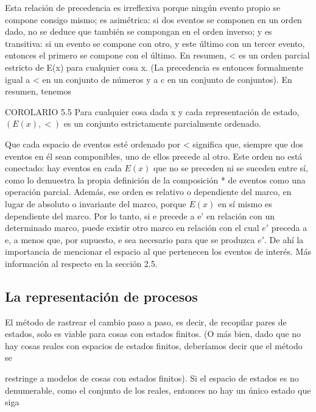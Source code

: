 
\begin{justifying}
    Esta relación de precedencia es irreflexiva porque ningún evento propio se compone consigo mismo; es asimétrica: si dos eventos se componen en un orden dado, no se deduce que también se compongan en el orden inverso; y es transitiva: si un evento se compone con otro, y este último con un tercer evento, entonces el primero se compone con el último. En resumen, < es un orden parcial estricto de E(x) para cualquier cosa x. (La precedencia es entonces formalmente igual a < en un conjunto de números y a c en un conjunto de conjuntos). En resumen, tenemos
    
    \bigskip COROLARIO 5.5 Para cualquier cosa dada x y cada representación de estado,\bigskip $(E(x), <)$ es un conjunto estrictamente parcialmente ordenado.
    
    Que cada espacio de eventos esté ordenado por < significa que, siempre que dos eventos en él sean componibles, uno de ellos precede al otro. Este orden no está conectado: hay eventos en cada $E(x)$ que no se preceden ni se suceden entre sí, como lo demuestra la propia definición de la composición * de eventos como una operación parcial. Además, ese orden es relativo o dependiente del marco, en lugar de absoluto o invariante del marco, porque $E(x)$ en sí mismo es dependiente del marco. Por lo tanto, si e precede a e' en relación con un determinado marco, puede existir otro marco en relación con el cual $e'$ preceda a e, a menos que, por supuesto, e sea necesario para que se produzca $e'$. De ahí la importancia de mencionar el espacio al que pertenecen los eventos de interés. Más información al respecto en la sección 2.5.

    \subsection{La representación de procesos}
    El método de rastrear el cambio paso a paso, es decir, de recopilar pares de
    estados, solo es viable para cosas con estados finitos. (O más bien, dado que no hay
    cosas reales con espacios de estados finitos, deberíamos decir que el método se

    restringe a modelos de cosas con estados finitos). Si el espacio de estados es no
    denumerable, como el conjunto de los reales, entonces no hay un único estado que siga


\end{justifying}
